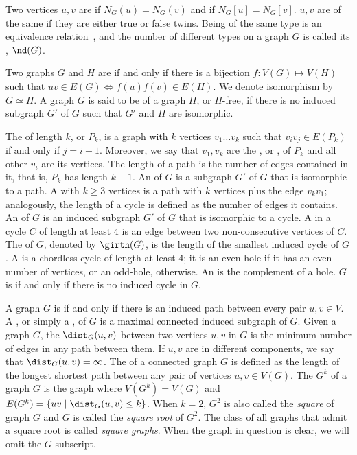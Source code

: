 Two vertices $u,v$ are  if $N_G(u) = N_G(v)$ and  if $N_G[u] = N_G[v]$. $u,v$ are of the same  if they are either true or false twins.
Being of the same type is an equivalence relation~\citep{neighbourhood_diversity}, and the number of different types on a graph $G$ is called its , $\nd(G)$.

Two graphs $G$ and $H$ are  if and only if there is a bijection $f: V(G) \mapsto V(H)$ such that $uv \in E(G) \Leftrightarrow f(u)f(v) \in E(H)$.
We denote isomorphism by $G \simeq H$.
A graph $G$ is said to be  of a graph $H$, or $H$-free, if there is no induced subgraph $G'$ of $G$ such that $G'$ and $H$ are isomorphic.

The  of length $k$, or $P_k$, is a graph with $k$ vertices $v_1 \dots v_k$ such that $v_iv_j \in E(P_k)$ if and only if $j = i+1$. Moreover, we say that $v_1, v_k$ are the , or , of $P_k$ and all other $v_i$ are its  vertices.
The length of a path is the number of edges contained in it, that is, $P_k$ has length $k-1$.
An  of $G$ is a subgraph $G'$ of $G$ that is isomorphic to a path.
A  with  $k \geq 3$ vertices is a path with $k$ vertices plus the edge $v_kv_1$; analogously, the length of a cycle is defined as the number of edges it contains.
An  of $G$ is an induced subgraph $G'$ of $G$ that is isomorphic to a cycle.
A  in a cycle $C$ of length at least 4 is an edge between two non-consecutive vertices of $C$.
The  of $G$, denoted by $\girth(G)$, is the length of the smallest induced cycle of $G$.
A  is a chordless cycle of length at least 4; it is an even-hole if it has an even number of vertices, or an odd-hole, otherwise. An  is the complement of a hole.
$G$ is  if and only if there is no induced cycle in $G$.


A graph $G$ is  if and only if there is an induced path between every pair $u,v \in V$.
A , or simply a , of $G$ is a maximal connected induced subgraph of $G$.
Given a graph $G$, the  $\dist_G(u,v)$ between two vertices $u,v$ in $G$ is the minimum number of edges in any path between them.
If $u,v$ are in different components, we say that $\dist_G(u,v) = \infty$.
The  of a connected graph $G$ is defined as the length of the longest shortest path between any pair of vertices $u,v \in V(G)$.
The  $G^k$ of a graph $G$ is the graph where $V(G^k) = V(G)$ and $E(G^k) = \{uv \mid \dist_G(u,v) \leq k\}$.
When $k = 2$, $G^2$ is also called the \textit{square} of graph $G$ and $G$ is called the \textit{square root} of $G^2$.
The class of all graphs that admit a square root is called \textit{square graphs}.
When the graph in question is clear, we will omit the $G$ subscript.

